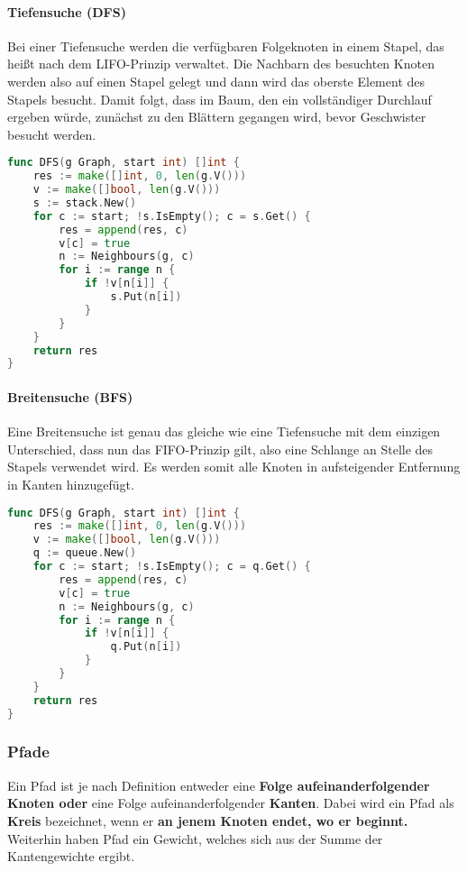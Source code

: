 \documentclass{article}
\begin{document}
\paragraph{Tiefensuche (DFS)}
Bei einer Tiefensuche werden die verfügbaren Folgeknoten in einem Stapel, das heißt nach dem LIFO-Prinzip verwaltet. Die Nachbarn des besuchten Knoten werden also auf einen Stapel gelegt und dann wird das oberste Element des Stapels besucht. Damit folgt, dass im Baum, den ein vollständiger Durchlauf ergeben würde, zunächst zu den Blättern gegangen wird, bevor Geschwister besucht werden.
\begin{lstlisting}[language=go]
func DFS(g Graph, start int) []int {
    res := make([]int, 0, len(g.V()))
    v := make([]bool, len(g.V()))
    s := stack.New()
    for c := start; !s.IsEmpty(); c = s.Get() {
        res = append(res, c)
        v[c] = true
        n := Neighbours(g, c)
        for i := range n {
            if !v[n[i]] {
                s.Put(n[i])
            }
        }
    }
    return res
}
\end{lstlisting}
\paragraph{Breitensuche (BFS)}
Eine Breitensuche ist genau das gleiche wie eine Tiefensuche mit dem einzigen Unterschied, dass nun das FIFO-Prinzip gilt, also eine Schlange an Stelle des Stapels verwendet wird. Es werden somit alle Knoten in aufsteigender Entfernung in Kanten hinzugefügt.
\begin{lstlisting}[language=go]
func DFS(g Graph, start int) []int {
    res := make([]int, 0, len(g.V()))
    v := make([]bool, len(g.V()))
    q := queue.New()
    for c := start; !s.IsEmpty(); c = q.Get() {
        res = append(res, c)
        v[c] = true
        n := Neighbours(g, c)
        for i := range n {
            if !v[n[i]] {
                q.Put(n[i])
            }
        }
    }
    return res
}
\end{lstlisting}
\subsubsection{Pfade}
Ein Pfad ist je nach Definition entweder eine \textbf{Folge aufeinanderfolgender Knoten oder} eine Folge aufeinanderfolgender \textbf{Kanten}. Dabei wird ein Pfad als \textbf{Kreis} bezeichnet, wenn er \textbf{an jenem Knoten endet, wo er beginnt.} Weiterhin haben Pfad ein Gewicht, welches sich aus der Summe der Kantengewichte ergibt. 
\end{document}
